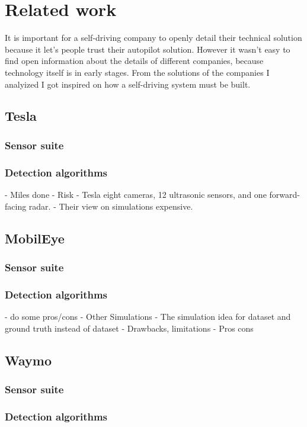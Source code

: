 \chapter{Related work}
\label{chap:relatedwork}

It is important for a self-driving company to openly detail their technical
solution because it let's people trust their autopilot solution. However it
wasn't easy to find open information about the details of different companies,
because technology itself is in early stages. From the solutions of the
companies I analyized I got inspired on how a self-driving system must be built. 

\section{Tesla}

\subsection{Sensor suite}

\subsection{Detection algorithms}
- Miles done
- Risk
- Tesla  eight cameras, 12 ultrasonic sensors, and one forward-facing radar.
  - Their view on simulations
expensive.
\section{MobilEye}

\subsection{Sensor suite}

\subsection{Detection algorithms}

  -  do some pros/cons
- Other Simulations
- The simulation idea for dataset and ground truth instead of dataset
  - Drawbacks, limitations
  - Pros cons



\section{Waymo}

\subsection{Sensor suite}

\subsection{Detection algorithms}
